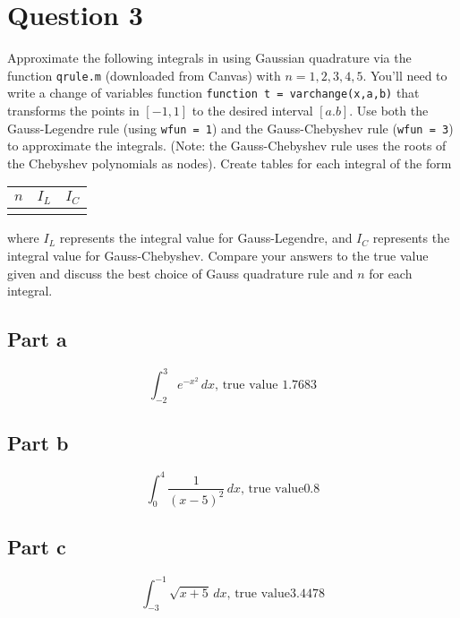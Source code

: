 \section{Question 3}

\begin{question}
    Approximate the following integrals in \MATLAB using Gaussian quadrature via the function \verb+qrule.m+ (downloaded from Canvas) with $n = 1,2,3,4,5$. You'll need to write a change of variables function \verb+function t = varchange(x,a,b)+ that transforms the points in $[-1,1]$ to the desired interval $[a.b]$. Use both the Gauss-Legendre rule (using \verb+wfun = 1+) and the Gauss-Chebyshev rule (\verb+wfun = 3+) to approximate the integrals. (Note: the Gauss-Chebyshev rule uses the roots of the Chebyshev polynomials as nodes). Create tables for each integral of the form \begin{tabular}{c|c|c} $n$ & $I_L$ & $I_C$ \\ \hline && \end{tabular} where $I_L$ represents the integral value for Gauss-Legendre, and $I_C$ represents the integral value for Gauss-Chebyshev. Compare your answers to the true value given and discuss the best choice of Gauss quadrature rule and $n$ for each integral.
\end{question}

\subsection{Part a}

\begin{question}
    \begin{equation}
        \int_{-2}^3 e^{-x^2}\, dx\text{, true value } 1.7683
    \end{equation}
\end{question}

\begin{answer}
    
\end{answer}

\subsection{Part b}

\begin{question}
    \begin{equation}
        \int_0^4 \frac{1}{(x-5)^2}\, dx\text{, true value} 0.8
    \end{equation}
\end{question}

\begin{answer}
    
\end{answer}

\subsection{Part c}

\begin{question}
    \begin{equation}
        \int_{-3}^{-1} \sqrt{x+5}\, dx\text{, true value} 3.4478
    \end{equation}
\end{question}

\begin{answer}
    
\end{answer}